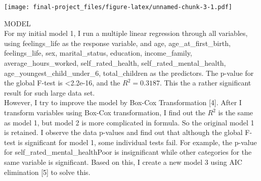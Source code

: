 \documentclass[
]{article}
\begin{document}
\texttt{[image: final-project\_files/figure-latex/unnamed-chunk-3-1.pdf]}

MODEL\\

For my initial model 1, I run a multiple linear regression through all
variables, using feelings\_life as the response variable, and age,
age\_at\_first\_birth, feelings\_life, sex, marital\_status, education,
income\_family, average\_hours\_worked, self\_rated\_health,
self\_rated\_mental\_health, age\_youngest\_child\_under\_6,
total\_children as the predictors. The p-value for the global F-test is
\textless2.2e-16, and the \(R^2 = 0.3187\). This the a rather
significant result for such large data set.\\

However, I try to improve the model by Box-Cox Transformation {[}4{]}.
After I transform variables using Box-Cox transformation, I find out the
\(R^2\) is the same as model 1, but model 2 is more complicated in
formula. So the original model 1 is retained. I observe the data
p-values and find out that although the global F-test is significant for
model 1, some individual tests fail. For example, the p-value for
self\_rated\_mental\_healthPoor is insignificant while other categories
for the same variable is significant. Based on this, I create a new
model 3 using AIC elimination {[}5{]} to solve this.\\
\end{document}
